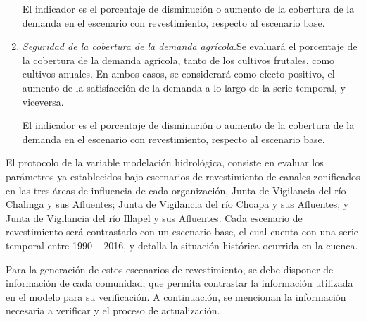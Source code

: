 \documentclass[]{article}
\begin{document}
\begin{enumerate}
El indicador es el porcentaje de disminución o aumento de la cobertura de la 	demanda en el escenario con revestimiento, respecto al escenario base.


\item \textit{Seguridad de la cobertura de la demanda agrícola}.Se evaluará el porcentaje de la cobertura de la demanda agrícola, tanto de los cultivos frutales, como cultivos anuales. En ambos casos, se considerará como efecto positivo, el aumento de la satisfacción de la demanda a lo largo de la serie temporal, y viceversa.

El indicador es el porcentaje de disminución o aumento de la cobertura de la 	demanda en el escenario con revestimiento, respecto al escenario base.

\end{enumerate}

El protocolo de la variable modelación hidrológica, consiste en evaluar los parámetros ya establecidos bajo escenarios de revestimiento de canales zonificados en las tres áreas de influencia de cada organización, Junta de Vigilancia del río Chalinga y sus Afluentes; Junta de Vigilancia del río Choapa y sus Afluentes; y Junta de Vigilancia del río Illapel y sus Afluentes. Cada escenario de revestimiento será contrastado con un escenario base, el cual cuenta con una serie temporal entre 1990 – 2016, y detalla la situación histórica ocurrida en la cuenca.

Para la generación de estos escenarios de revestimiento, se debe disponer de información de cada comunidad, que permita contrastar la información utilizada en el modelo para su verificación. A continuación, se mencionan la información necesaria a verificar y el proceso de actualización.
\end{document}
